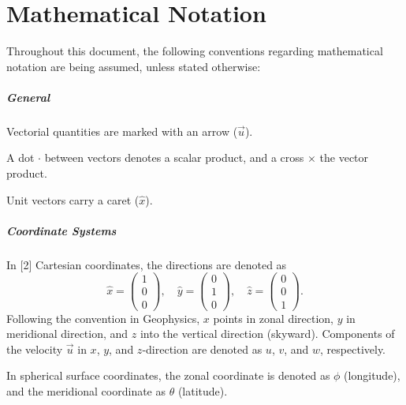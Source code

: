 \chapter*{Mathematical Notation}
\label{front:notation}

Throughout this document, the following conventions regarding mathematical notation are being assumed, unless stated otherwise:

\paragraph{General}
\begin{items}
	\item Vectorial quantities are marked with an arrow (\(\vec{u}\)). 
	\item A dot \(\cdot\) between vectors denotes a scalar product, and a cross \(\times\) the vector product.
	\item Unit vectors carry a caret (\(\hat{x}\)).
\end{items}

\paragraph{Coordinate Systems}
\begin{items}
	\item In%
		\sidefigure*{}{\resizebox{.9\marginparwidth}{!}{}}[2]%
	Cartesian coordinates, the directions are denoted as
	\begin{equation} 
	\hat{x} = \left( \begin{matrix} 1 \\ 0 \\ 0 \end{matrix} \right), \quad
	\hat{y} = \left( \begin{matrix} 0 \\ 1 \\ 0 \end{matrix} \right), \quad
	\hat{z} = \left( \begin{matrix} 0 \\ 0 \\ 1 \end{matrix} \right).
	\end{equation}
	Following the convention in Geophysics, \(x\) points in zonal direction, \(y\) in meridional direction, and \(z\) into the vertical direction (skyward). Components of the velocity \(\vec{u}\) in \(x\), \(y\), and \(z\)-direction are denoted as \(u\), \(v\), and \(w\), respectively.
	\item In spherical surface coordinates, the zonal coordinate is denoted as \(\phi\) (longitude), and the meridional coordinate as \(\theta\) (latitude).
\end{items}

